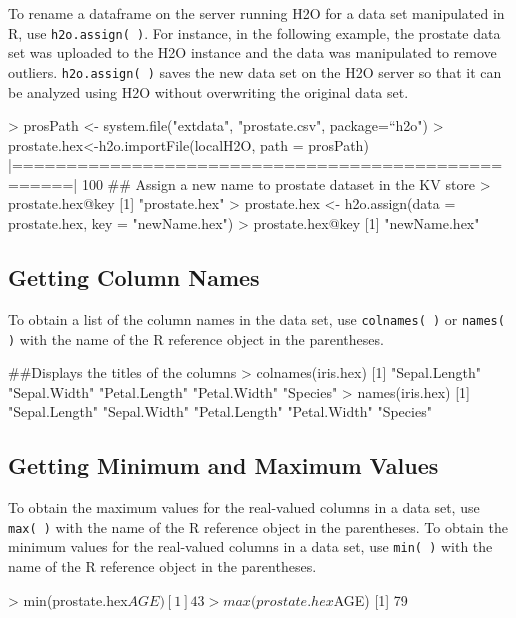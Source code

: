 \documentclass[11pt]{article}
\begin{document}
{To rename a dataframe on the server running H2O for a data set manipulated in R, use {\texttt{h2o.assign( )}}. For instance, in the following example, the prostate data set was uploaded to the H2O instance and the data was manipulated to remove outliers. {\texttt{h2o.assign( )}} saves the new data set on the H2O server so that it can be analyzed using H2O without overwriting the original data set.  

\begin{spverbatim}
> prosPath <- system.file("extdata", "prostate.csv", package=“h2o")
> prostate.hex<-h2o.importFile(localH2O, path = prosPath)
    |===================================================| 100%
## Assign a new name to prostate dataset in the KV store
> prostate.hex@key
[1] "prostate.hex"
> prostate.hex <- h2o.assign(data = prostate.hex, key = "newName.hex")
> prostate.hex@key
[1] "newName.hex"

\end{spverbatim}

\subsection{Getting Column Names}

To obtain a list of the column names in the data set, use {\texttt{colnames( )}} or {\texttt{names( )}} with the name of the R reference object in the parentheses. 

\begin{spverbatim}
##Displays the titles of the columns
> colnames(iris.hex)
[1] "Sepal.Length" "Sepal.Width"  "Petal.Length" "Petal.Width"  "Species"     
> names(iris.hex)
[1] "Sepal.Length" "Sepal.Width"  "Petal.Length" "Petal.Width"  "Species"     
\end{spverbatim}


\subsection{Getting Minimum and Maximum Values}

To obtain the maximum values for the real-valued columns in a data set, use {\texttt{max( )}} with the name of the R reference object in the parentheses. 
To obtain the minimum values for the real-valued columns in a data set, use {\texttt{min( )}} with the name of the R reference object in the parentheses. 
\begin{spverbatim}
> min(prostate.hex$AGE)
[1] 43
> max(prostate.hex$AGE)
[1] 79
\end{spverbatim}


}
\end{document}
